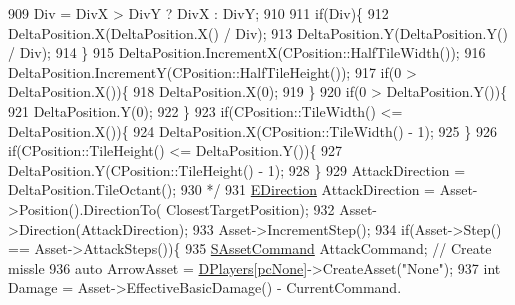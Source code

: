 \begin{DoxyCode}
{909 \textcolor{comment}{                        Div = DivX > DivY ? DivX : DivY;}
910 \textcolor{comment}{}
911 \textcolor{comment}{                        if(Div)\{}
912 \textcolor{comment}{                            DeltaPosition.X(DeltaPosition.X() / Div);}
913 \textcolor{comment}{                            DeltaPosition.Y(DeltaPosition.Y() / Div);}
914 \textcolor{comment}{                        \}}
915 \textcolor{comment}{                        DeltaPosition.IncrementX(CPosition::HalfTileWidth());}
916 \textcolor{comment}{                        DeltaPosition.IncrementY(CPosition::HalfTileHeight());}
917 \textcolor{comment}{                        if(0 > DeltaPosition.X())\{}
918 \textcolor{comment}{                            DeltaPosition.X(0);}
919 \textcolor{comment}{                        \}}
920 \textcolor{comment}{                        if(0 > DeltaPosition.Y())\{}
921 \textcolor{comment}{                            DeltaPosition.Y(0);}
922 \textcolor{comment}{                        \}}
923 \textcolor{comment}{                        if(CPosition::TileWidth() <= DeltaPosition.X())\{}
924 \textcolor{comment}{                            DeltaPosition.X(CPosition::TileWidth() - 1);}
925 \textcolor{comment}{                        \}}
926 \textcolor{comment}{                        if(CPosition::TileHeight() <= DeltaPosition.Y())\{}
927 \textcolor{comment}{                            DeltaPosition.Y(CPosition::TileHeight() - 1);}
928 \textcolor{comment}{                        \}}
929 \textcolor{comment}{                        AttackDirection = DeltaPosition.TileOctant();}
930 \textcolor{comment}{                        */}
931                         \hyperlink{GameDataTypes_8h_acb2b033915f6659a71a38b5aa6e4eb42}{EDirection} AttackDirection = Asset->Position().DirectionTo(
      ClosestTargetPosition);
932                         Asset->Direction(AttackDirection);
933                         Asset->IncrementStep();
934                         \textcolor{keywordflow}{if}(Asset->Step() == Asset->AttackSteps())\{
935                             \hyperlink{structSAssetCommand}{SAssetCommand} AttackCommand; \textcolor{comment}{// Create missle}
936                             \textcolor{keyword}{auto} ArrowAsset = \hyperlink{classCGameModel_a524436c3560b10e1c6d6fdd0b66565dc}{DPlayers}[\hyperlink{GameDataTypes_8h_aafb0ca75933357ff28a6d7efbdd7602fa88767aa8e02c7b3192bbab4127b3d729}{pcNone}]->CreateAsset(\textcolor{stringliteral}{"None"});
937                             \textcolor{keywordtype}{int} Damage = Asset->EffectiveBasicDamage() - CurrentCommand.
}
\end{DoxyCode}
